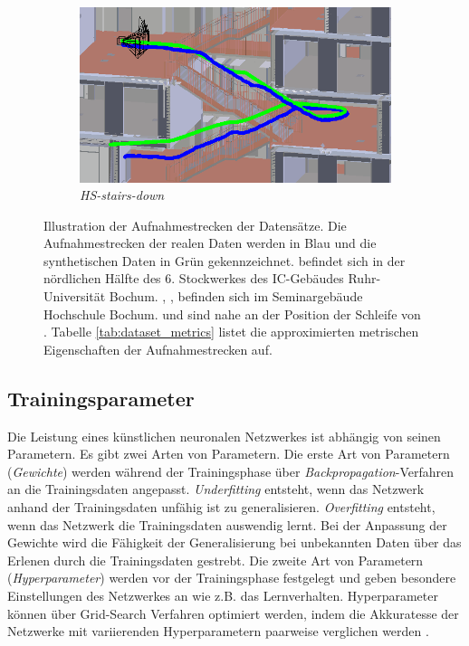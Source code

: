 \begin{figure}[H]
\begin{subfigure}[tl]{0.45\linewidth}
		\flushright		\includegraphics[width=\linewidth]{images/trajectories/hs_down.png}
		\caption{\textit{HS-stairs-down}}
		\label{subfig:traj_hs-down}
	\end{subfigure}
	\hfill
	\caption{Illustration der Aufnahmestrecken der Datensätze. Die Aufnahmestrecken der realen Daten werden in Blau und die synthetischen Daten in Grün gekennzeichnet.  befindet sich in der nördlichen Hälfte des 6. Stockwerkes des IC-Gebäudes Ruhr-Universität Bochum. , ,  befinden sich im Seminargebäude Hochschule Bochum.  und  sind nahe an der Position der Schleife von . Tabelle \ref{tab:dataset_metrics} listet die approximierten metrischen Eigenschaften der Aufnahmestrecken auf.}
	\label{fig:trajectories}
\end{figure}


\subsection{Trainingsparameter}
Die Leistung eines künstlichen neuronalen Netzwerkes ist abhängig von seinen Parametern. Es gibt zwei Arten von Parametern. Die erste Art von Parametern (\textit{Gewichte}) werden während der Trainingsphase über \textit{Backpropagation}-Verfahren an die Trainingsdaten angepasst. \textit{Underfitting} entsteht, wenn das Netzwerk anhand der Trainingsdaten unfähig ist zu generalisieren. \textit{Overfitting} entsteht, wenn das Netzwerk die Trainingsdaten auswendig lernt. Bei der Anpassung der Gewichte wird die Fähigkeit der Generalisierung bei unbekannten Daten über das Erlenen durch die Trainingsdaten gestrebt. Die zweite Art von Parametern (\textit{Hyperparameter}) werden vor der Trainingsphase festgelegt und geben besondere Einstellungen des Netzwerkes an wie z.B. das Lernverhalten. Hyperparameter können über Grid-Search Verfahren optimiert werden, indem die Akkuratesse der Netzwerke mit variierenden Hyperparametern paarweise verglichen werden \cite{Goodfellow-et-al-2016}.


